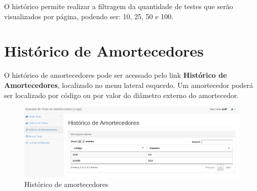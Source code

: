 O histórico permite realizar a filtragem da quantidade de testes que serão visualizados por página, podendo ser: 10, 25, 50 e 100.


\section{Histórico de Amortecedores}

O histórico de amortecedores pode ser acessado pelo link \textbf{Histórico de Amortecedores}, localizado no menu lateral esquerdo. Um amortecedor poderá ser localizado por código ou por valor do diâmetro externo do amortecedor.

\begin{figure}[h]
	\centering
	\label{img:historico}
		\includegraphics[width=1\textwidth]{figuras/historico_amortecedor.eps}
	\caption{Histórico de amortecedores}
\end{figure}
